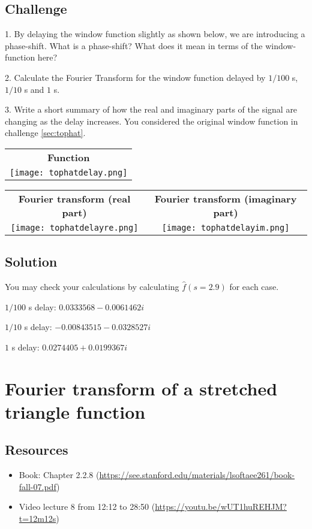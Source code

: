 \subsection*{Challenge}
1. By delaying the window function slightly as shown below, we are introducing a phase-shift. What is a phase-shift? What does it mean in terms of the window-function here?

2. Calculate the Fourier Transform for the window function delayed by $1/100$ s, $1/10$ s and $1$ s.

3. Write a short summary of how the real and imaginary parts of the signal are changing as the delay increases. You considered the original window function in challenge \ref{sec:tophat}.

\begin{tabular}{c}
    \textbf{Function} \\
    \texttt{[image: tophatdelay.png]}
\end{tabular}

\begin{tabular}{cc}
    \textbf{Fourier transform (real part)} & \textbf{Fourier transform (imaginary part)}\\
    \texttt{[image: tophatdelayre.png]} & \texttt{[image: tophatdelayim.png]}
\end{tabular}

\subsection*{Solution}
You may check your calculations by calculating $\hat{f}(s=2.9)$ for each case.

$1/100$ s delay: $0.0333568 - 0.0061462i$

$1/10$ s delay: $-0.00843515 - 0.0328527i$

$1$ s delay: $0.0274405 + 0.0199367i$




\newpage
\section{Fourier transform of a stretched triangle function}

\subsection*{Resources}
\begin{itemize}
    \item Book: Chapter 2.2.8 (\url{https://see.stanford.edu/materials/lsoftaee261/book-fall-07.pdf})
    \item Video lecture 8 from 12:12 to 28:50 (\url{https://youtu.be/wUT1huREHJM?t=12m12s})
\end{itemize}

